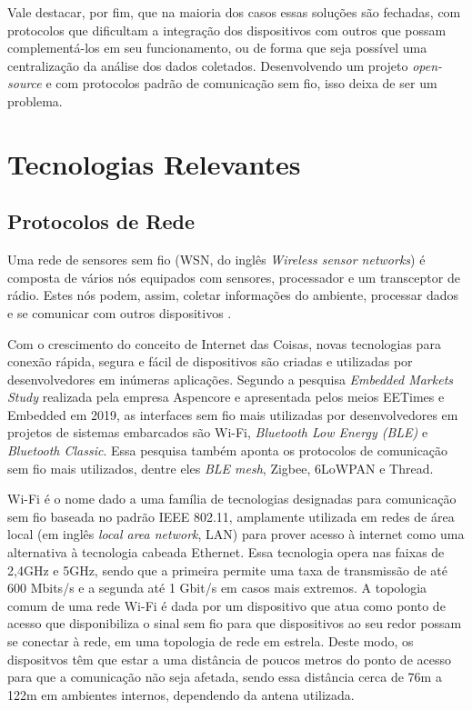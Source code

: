 \documentclass[../monografia.tex]{subfiles}
\begin{document}
Vale destacar, por fim, que na maioria dos casos essas soluções são fechadas, com protocolos que dificultam a integração dos dispositivos com outros que possam complementá-los em seu funcionamento, ou de forma que seja possível uma centralização da análise dos dados coletados. Desenvolvendo um projeto \textit{open-source} e com protocolos padrão de comunicação sem fio, isso deixa de ser um problema. 

\section{Tecnologias Relevantes} 

\subsection{Protocolos de Rede} 

Uma rede de sensores sem fio (WSN, do inglês \textit{Wireless sensor networks}) é composta de vários nós equipados com sensores, processador e um transceptor de rádio. Estes nós podem, assim, coletar informações do ambiente, processar dados e se comunicar com outros dispositivos \cite{wsn-networking}.

Com o crescimento do conceito de Internet das Coisas, novas tecnologias para conexão rápida, segura e fácil de dispositivos são criadas e utilizadas por desenvolvedores em inúmeras aplicações. Segundo a pesquisa \textit{Embedded Markets Study} realizada pela empresa Aspencore\cite{embedded-market-study} e apresentada pelos meios EETimes\cite{eetimes} e Embedded\cite{embedded} em 2019, as interfaces sem fio mais utilizadas por desenvolvedores em  projetos de sistemas embarcados são Wi-Fi, \textit{Bluetooth Low Energy (BLE)} e \textit{Bluetooth Classic}. Essa pesquisa também aponta os protocolos de comunicação sem fio mais utilizados, dentre eles \textit{BLE mesh}, Zigbee, 6LoWPAN e Thread. 

Wi-Fi é o nome dado a uma família de tecnologias designadas para comunicação sem fio baseada no padrão IEEE 802.11\cite{802.11}, amplamente utilizada em redes de área local (em inglês \textit{local area network}, LAN) para prover acesso à internet como uma alternativa à tecnologia cabeada Ethernet. Essa tecnologia opera nas faixas de 2,4GHz e 5GHz, sendo que a primeira permite uma taxa de transmissão de até 600 Mbits/s e a segunda até 1 Gbit/s em casos mais extremos\cite{Wi-Fi-datarate}. A topologia comum de uma rede Wi-Fi é dada por um  dispositivo que atua como ponto de acesso que disponibiliza o sinal sem fio para que dispositivos ao seu redor possam se conectar à rede, em uma topologia de rede em estrela. Deste modo, os dispositvos têm que estar a uma distância de poucos metros do ponto de acesso para que a comunicação não seja afetada, sendo essa distância cerca de 76m a 122m em ambientes internos\cite{wifi-range}, dependendo da antena utilizada.
\end{document}
